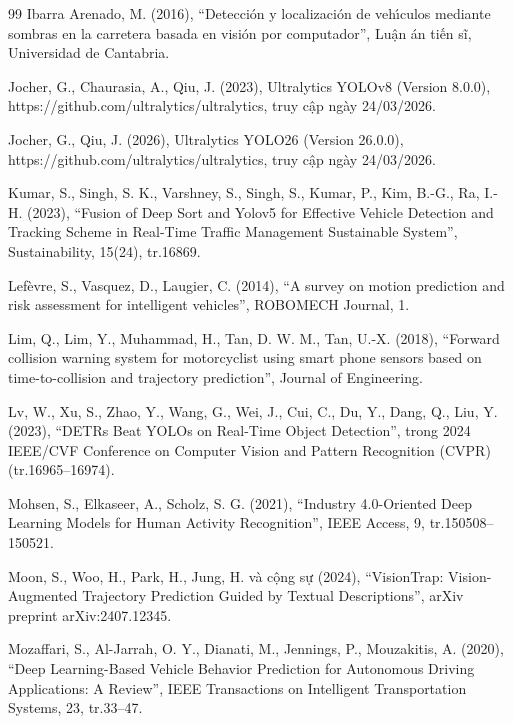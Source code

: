 \begin{thebibliography}{99}
Ibarra Arenado, M. (2016), 
“Detecci{\'o}n y localizaci{\'o}n de veh{\'\i}culos mediante sombras en la carretera basada en visi{\'o}n por computador”, 
Luận án tiến sĩ, Universidad de Cantabria.

Jocher, G., Chaurasia, A., Qiu, J. (2023), 
Ultralytics YOLOv8 (Version 8.0.0), 
https://github.com/ultralytics/ultralytics, 
truy cập ngày 24/03/2026.

Jocher, G., Qiu, J. (2026), 
Ultralytics YOLO26 (Version 26.0.0), 
https://github.com/ultralytics/ultralytics, 
truy cập ngày 24/03/2026.

Kumar, S., Singh, S. K., Varshney, S., Singh, S., Kumar, P., Kim, B.-G., Ra, I.-H. (2023), 
“Fusion of Deep Sort and Yolov5 for Effective Vehicle Detection and Tracking Scheme in Real-Time Traffic Management Sustainable System”, 
Sustainability, 15(24), tr.16869.

Lef{\`e}vre, S., Vasquez, D., Laugier, C. (2014), 
“A survey on motion prediction and risk assessment for intelligent vehicles”, 
ROBOMECH Journal, 1.

Lim, Q., Lim, Y., Muhammad, H., Tan, D. W. M., Tan, U.-X. (2018), 
“Forward collision warning system for motorcyclist using smart phone sensors based on time-to-collision and trajectory prediction”, 
Journal of Engineering.

Lv, W., Xu, S., Zhao, Y., Wang, G., Wei, J., Cui, C., Du, Y., Dang, Q., Liu, Y. (2023), 
“DETRs Beat YOLOs on Real-Time Object Detection”, 
trong 2024 IEEE/CVF Conference on Computer Vision and Pattern Recognition (CVPR) (tr.16965--16974).

Mohsen, S., Elkaseer, A., Scholz, S. G. (2021), 
“Industry 4.0-Oriented Deep Learning Models for Human Activity Recognition”, 
IEEE Access, 9, tr.150508--150521.

Moon, S., Woo, H., Park, H., Jung, H. và cộng sự (2024), 
“VisionTrap: Vision-Augmented Trajectory Prediction Guided by Textual Descriptions”, 
arXiv preprint arXiv:2407.12345.

Mozaffari, S., Al-Jarrah, O. Y., Dianati, M., Jennings, P., Mouzakitis, A. (2020), 
“Deep Learning-Based Vehicle Behavior Prediction for Autonomous Driving Applications: A Review”, 
IEEE Transactions on Intelligent Transportation Systems, 23, tr.33--47.


\end{thebibliography}
